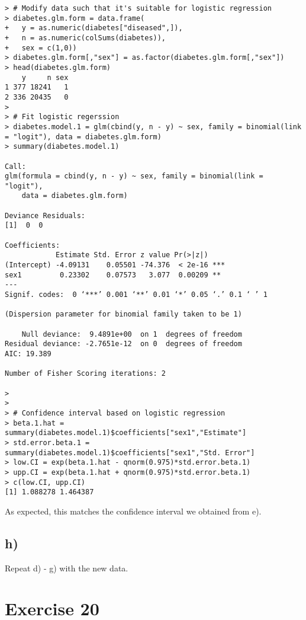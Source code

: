 \documentclass[a4paper]{article}
\begin{document}
\begin{lstlisting}
> # Modify data such that it's suitable for logistic regression
> diabetes.glm.form = data.frame(
+   y = as.numeric(diabetes["diseased",]),
+   n = as.numeric(colSums(diabetes)),
+   sex = c(1,0))
> diabetes.glm.form[,"sex"] = as.factor(diabetes.glm.form[,"sex"])
> head(diabetes.glm.form)
    y     n sex
1 377 18241   1
2 336 20435   0
> 
> # Fit logistic regerssion
> diabetes.model.1 = glm(cbind(y, n - y) ~ sex, family = binomial(link = "logit"), data = diabetes.glm.form)
> summary(diabetes.model.1)

Call:
glm(formula = cbind(y, n - y) ~ sex, family = binomial(link = "logit"), 
    data = diabetes.glm.form)

Deviance Residuals: 
[1]  0  0

Coefficients:
            Estimate Std. Error z value Pr(>|z|)    
(Intercept) -4.09131    0.05501 -74.376  < 2e-16 ***
sex1         0.23302    0.07573   3.077  0.00209 ** 
---
Signif. codes:  0 ‘***’ 0.001 ‘**’ 0.01 ‘*’ 0.05 ‘.’ 0.1 ‘ ’ 1

(Dispersion parameter for binomial family taken to be 1)

    Null deviance:  9.4891e+00  on 1  degrees of freedom
Residual deviance: -2.7651e-12  on 0  degrees of freedom
AIC: 19.389

Number of Fisher Scoring iterations: 2

> 
> 
> # Confidence interval based on logistic regression
> beta.1.hat = summary(diabetes.model.1)$coefficients["sex1","Estimate"]
> std.error.beta.1 = summary(diabetes.model.1)$coefficients["sex1","Std. Error"]
> low.CI = exp(beta.1.hat - qnorm(0.975)*std.error.beta.1)
> upp.CI = exp(beta.1.hat + qnorm(0.975)*std.error.beta.1)
> c(low.CI, upp.CI)
[1] 1.088278 1.464387
\end{lstlisting}

As expected, this matches the confidence interval we obtained from e).\\

\vspace{\baselineskip}
\subsection{h)}
Repeat d) - g) with the new data.



\vspace{\baselineskip}
\section{Exercise 20}
\end{document}
